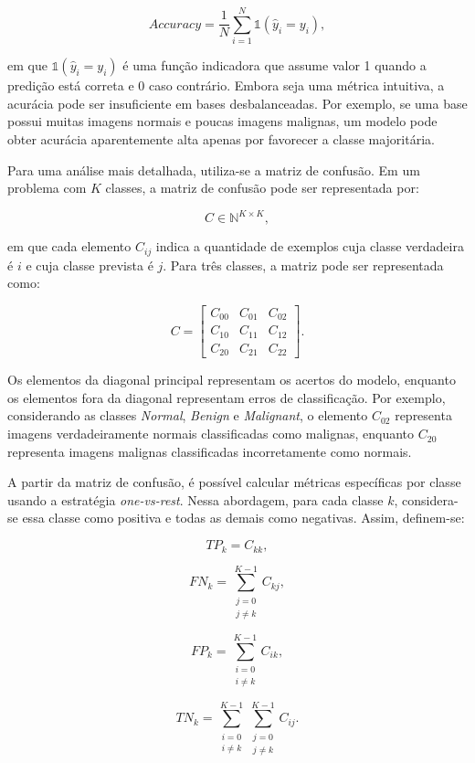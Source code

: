 \documentclass[
    12pt,
    openright,
    oneside,
    a4paper,
    english,
    brazil
]{abntex2}
\begin{document}
\[
Accuracy =
\frac{1}{N}
\sum_{i=1}^{N}
\mathbb{1}(\hat{y}_i = y_i),
\]

em que \(\mathbb{1}(\hat{y}_i = y_i)\) é uma função indicadora que assume valor 1 quando a predição está correta e 0 caso contrário. Embora seja uma métrica intuitiva, a acurácia pode ser insuficiente em bases desbalanceadas. Por exemplo, se uma base possui muitas imagens normais e poucas imagens malignas, um modelo pode obter acurácia aparentemente alta apenas por favorecer a classe majoritária.

Para uma análise mais detalhada, utiliza-se a matriz de confusão. Em um problema com \(K\) classes, a matriz de confusão pode ser representada por:

\[
C \in \mathbb{N}^{K \times K},
\]

em que cada elemento \(C_{ij}\) indica a quantidade de exemplos cuja classe verdadeira é \(i\) e cuja classe prevista é \(j\). Para três classes, a matriz pode ser representada como:

\[
C =
\begin{bmatrix}
C_{00} & C_{01} & C_{02} \\
C_{10} & C_{11} & C_{12} \\
C_{20} & C_{21} & C_{22}
\end{bmatrix}.
\]

Os elementos da diagonal principal representam os acertos do modelo, enquanto os elementos fora da diagonal representam erros de classificação. Por exemplo, considerando as classes \textit{Normal}, \textit{Benign} e \textit{Malignant}, o elemento \(C_{02}\) representa imagens verdadeiramente normais classificadas como malignas, enquanto \(C_{20}\) representa imagens malignas classificadas incorretamente como normais.

A partir da matriz de confusão, é possível calcular métricas específicas por classe usando a estratégia \textit{one-vs-rest}. Nessa abordagem, para cada classe \(k\), considera-se essa classe como positiva e todas as demais como negativas. Assim, definem-se:

\[
TP_k = C_{kk},
\]

\[
FN_k =
\sum_{\substack{j=0 \\ j \neq k}}^{K-1}
C_{kj},
\]

\[
FP_k =
\sum_{\substack{i=0 \\ i \neq k}}^{K-1}
C_{ik},
\]

\[
TN_k =
\sum_{\substack{i=0 \\ i \neq k}}^{K-1}
\sum_{\substack{j=0 \\ j \neq k}}^{K-1}
C_{ij}.
\]
\end{document}
